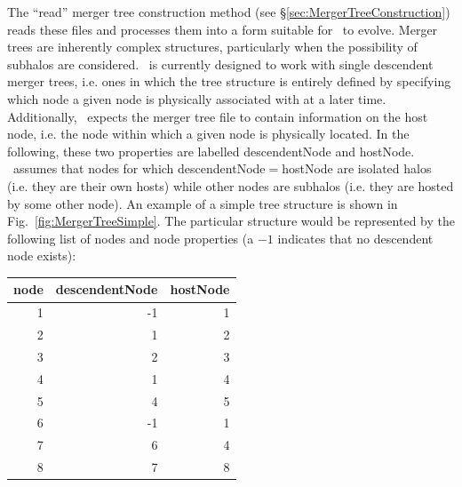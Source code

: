 The ``read'' merger tree construction method (see \S\ref{sec:MergerTreeConstruction}) reads these files and processes them into a form suitable for \glc\ to evolve. Merger trees are inherently complex structures, particularly when the possibility of subhalos are considered. \glc\ is currently designed to work with single descendent merger trees, i.e. ones in which the tree structure is entirely defined by specifying which \gls{node} a given \gls{node} is physically associated with at a later time. Additionally, \glc\ expects the merger tree file to contain information on the host \gls{node}, i.e. the node within which a given node is physically located. In the following, these two properties are labelled {\normalfont \ttfamily descendentNode} and {\normalfont \ttfamily hostNode}. \glc\ assumes that nodes for which {\normalfont \ttfamily descendentNode}$=${\normalfont \ttfamily hostNode} are isolated halos (i.e. they are their own hosts) while other nodes are subhalos (i.e. they are hosted by some other node). An example of a simple tree structure is shown in Fig.~\ref{fig:MergerTreeSimple}. The particular structure would be represented by the following list of nodes and node properties (a $-1$ indicates that no descendent node exists):
\begin{center}
\begin{tabular}{rrr}
\hline
{\normalfont \ttfamily node} & {\normalfont \ttfamily descendentNode} & {\normalfont \ttfamily hostNode} \\
\hline
1 & -1 & 1 \\
2 &  1 & 2 \\
3 &  2 & 3 \\
4 &  1 & 4 \\
5 &  4 & 5 \\
6 & -1 & 1 \\
7 &  6 & 4 \\
8 &  7 & 8 \\
\hline
\end{tabular}
\end{center}

